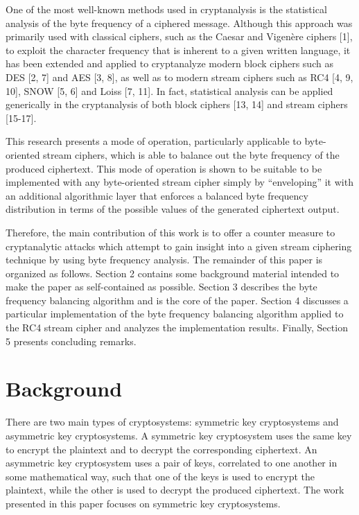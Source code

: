 \documentclass[conference]{IEEEtran}
\begin{document}
One of the most well-known methods used in cryptanalysis is the statistical analysis of the byte frequency of a ciphered message. Although this approach was primarily used with classical ciphers, such as the Caesar and Vigenère ciphers [1], to exploit the character frequency that is inherent to a given written language, it has been extended and applied to cryptanalyze modern block ciphers such as DES [2, 7] and AES [3, 8], as well as to modern stream ciphers such as RC4 [4, 9, 10], SNOW [5, 6] and Loiss [7, 11]. In fact, statistical analysis can be applied generically in the cryptanalysis of both block ciphers [13, 14] and stream ciphers [15-17].  

This research presents a mode of operation, particularly applicable to byte-oriented stream ciphers, which is able to balance out the byte frequency of the produced ciphertext. This mode of operation is shown to be suitable to be implemented with any byte-oriented stream cipher simply by “enveloping” it with an additional algorithmic layer that enforces a balanced byte frequency distribution in terms of the possible values of the generated ciphertext output. 

Therefore, the main contribution of this work is to offer a counter measure to cryptanalytic attacks which attempt to gain insight into a given stream ciphering technique by using byte frequency analysis. 
The remainder of this paper is organized as follows. Section 2 contains some background material intended to make the paper as self-contained as possible. Section 3 describes the byte frequency balancing algorithm and is the core of the paper. Section 4 discusses a particular implementation of the byte frequency balancing algorithm applied to the RC4 stream cipher and analyzes the implementation results. Finally, Section 5 presents concluding remarks.



 

\section{Background}

There are two main types of cryptosystems: symmetric key cryptosystems and asymmetric key cryptosystems. A symmetric key cryptosystem uses the same key to encrypt the plaintext and to decrypt the corresponding ciphertext. An asymmetric key cryptosystem uses a pair of keys, correlated to one another in some mathematical way, such that one of the keys is used to encrypt the plaintext, while the other is used to decrypt the produced ciphertext. The work presented in this paper focuses on symmetric key cryptosystems. 
\end{document}
